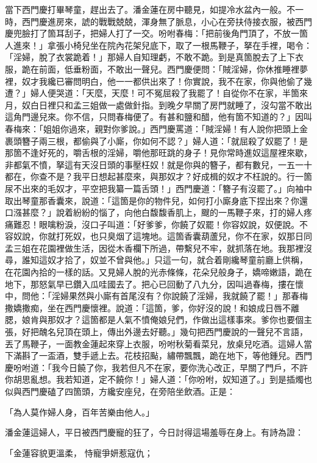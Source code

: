 當下西門慶打畢琴童，趕出去了。潘金蓮在房中聽見，如提冷水盆內一般。不一時，西門慶進房來，諕的戰戰兢兢，渾身無了脈息，小心在旁扶侍接衣服，被西門慶兜臉打了箇耳刮子，把婦人打了一交。吩咐春梅：「把前後角門頂了，不放一箇人進來！」拿張小椅兒坐在院內花架兒底下，取了一根馬鞭子，拏在手裡，喝令：「淫婦，脫了衣裳跪着！」那婦人自知理虧，不敢不跪。到是真箇脫去了上下衣服，跪在前面，低垂粉面，不敢出一聲兒。西門慶便問：「賊淫婦，你休推睡裡夢裡，奴才我纔已審問明白，他一一都供出來了！你實說，我不在家，你與他偷了幾遭？」婦人便哭道：「天麼，天麼！可不冤屈殺了我罷了！自從你不在家，半箇來月，奴白日裡只和孟三姐做一處做針指。到晚夕早關了房門就睡了，沒勾當不敢出這角門邊兒來。你不信，只問春梅便了。有甚和鹽和醋，他有箇不知道的？」因叫春梅來：「姐姐你過來，親對你爹說。」西門慶罵道：「賊淫婦！有人說你把頭上金裹頭簪子兩三根，都偷與了小廝，你如何不認？」婦人道：「就屈殺了奴罷了！是那箇不逢好死的，嚼舌根的淫婦，嚼他那旺跳的身子！見你常時進奴這屋裡來歇，非都氣不憤，拏這有天沒日頭的事壓枉奴！就是你與的簪子，都有數兒，一五一十都在，你查不是？我平日想起甚麼來，與那奴才？好成楫的奴才不枉說的。行一箇尿不出來的毛奴才，平空把我纂一篇舌頭！」西門慶道：「簪子有沒罷了。」向袖中取出琴童那香囊來，說道：「這箇是你的物件兒，如何打小廝身底下捏出來？你還口漒甚麼？」說着紛紛的惱了，向他白馥馥香肌上，颼的一馬鞭子來，打的婦人疼痛難忍！眼噙粉淚，沒口子叫道：「好爹爹，你饒了奴罷！你容奴說，奴便說。不容奴說，你就打死奴，也只臭烟了這塊地。這箇香囊葫蘆兒，你不在家，奴那日同孟三姐在花園裡做生活，因從木香欄下所過，帶繫兒不牢，就抓落在地。我那裡沒尋，誰知這奴才拾了，奴並不曾與他。」只這一句，就合着剛纔琴童前廳上供稱，在花園內拾的一樣的話。又見婦人脫的光赤條條，花朵兒般身子，嬌啼嫩語，跪在地下，那怒氣早已鑽入瓜哇國去了。把心已回動了八九分，因叫過春梅，摟在懷中，問他：「淫婦果然與小廝有首尾沒有？你說饒了淫婦，我就饒了罷！」那春梅撒嬌撒痴，坐在西門慶懷裡。說道：「這箇，爹，你好沒的說！和娘成日唇不離腮，娘肯與那奴才？這箇都是人氣不憤俺娘兒們，作做出這樣事來。爹你也要個主張，好把醜名兒頂在頭上，傳出外邊去好聽。」幾句把西門慶說的一聲兒不言語，丟了馬鞭子，一面教金蓮起來穿上衣服，吩咐秋菊看菜兒，放桌兒吃酒。這婦人當下滿斟了一盃酒，雙手遞上去。花枝招颭，繡帶飄飄，跪在地下，等他鍾兒。西門慶吩咐道：「我今日饒了你，我若但凡不在家，要你洗心改正，早關了門戶，不許你胡思亂想。我若知道，定不饒你！」婦人道：「你吩咐，奴知道了。」到是插燭也似與西門慶磕了四箇頭，方纔安座兒，在旁陪坐飲酒。正是：

「為人莫作婦人身，百年苦樂由他人。」

潘金蓮這婦人，平日被西門慶寵的狂了，今日討得這場羞辱在身上。有詩為證：

「金蓮容貌更溫柔，  恃寵爭妍惹寇仇；

